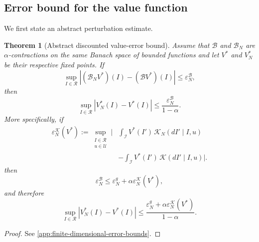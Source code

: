 \documentclass[10pt,twocolumn]{article}
\newtheorem{theorem}{Theorem}
\theoremstyle{remark}
\newcommand{\Ucal}{\mathcal{U}}
\begin{document}
\subsection{Error bound for the value function}
\label{subsec:value-error-bound}

We first state an abstract perturbation estimate.

\begin{theorem}[Abstract discounted value-error bound]
	\label{thm:abstract-value-error}
	Assume that \(\mathcal B\) and \(\mathcal B_N\) are \(\alpha\)-contractions on the same Banach space of bounded functions and let \(V^*\) and \(V_N^*\) be their respective fixed points. If
	\begin{equation*}
		\sup_{I\in\mathcal R}
		|(\mathcal B_NV^*)(I)-(\mathcal BV^*)(I)|
		\leq
		\varepsilon_N^{\mathcal B},
		\label{eq:bellman-perturbation-error}
	\end{equation*}
	then
	\begin{equation*}
		\sup_{I\in\mathcal R}
		|V_N^*(I)-V^*(I)|
		\leq
		\frac{\varepsilon_N^{\mathcal B}}
		{1-\alpha}.
		\label{eq:abstract-value-error-bound}
	\end{equation*}
	More specifically, if
\begin{equation}
	\begin{aligned}
		\varepsilon_N^{\mathcal K}(V^*)
		:=
		\sup_{\substack{I\in\mathcal R\\ u\in\Ucal}}
		\Bigg|
		&\int_{\mathcal I}
		V^*(I')\,
		\mathcal K_N(dI'\mid I,u)
		\\
		&-
		\int_{\mathcal I}
		V^*(I')\,
		\mathcal K(dI'\mid I,u)
		\Bigg|.
	\end{aligned}
	\label{eq:value-kernel-error}
\end{equation}
	then
	\begin{equation}
		\varepsilon_N^{\mathcal B}
		\leq
		\varepsilon_N^g
		+
		\alpha
		\varepsilon_N^{\mathcal K}(V^*),
		\label{eq:bellman-error-components}
	\end{equation}
	and therefore
	\begin{equation}
		\sup_{I\in\mathcal R}
		|V_N^*(I)-V^*(I)|
		\leq
		\frac{
			\varepsilon_N^g
			+
			\alpha\varepsilon_N^{\mathcal K}(V^*)
		}{1-\alpha}.
		\label{eq:general-value-error-bound}
	\end{equation}
\end{theorem}

\begin{proof}
	See \cref{app:finite-dimensional-error-bounds}.
\end{proof}
\end{document}
